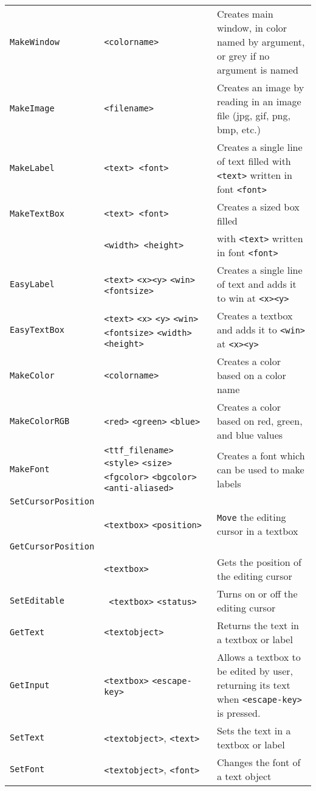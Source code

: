 \begin{longtable}{p{3cm}p{3cm}p{6cm}}
\verb+MakeWindow+ &\verb+<colorname>+ &Creates main window, in color named by argument, or grey if no argument is named\\ 
\verb+MakeImage+ &\verb+<filename>+ &Creates an image by reading in an image file (jpg, gif, png, bmp, etc.)\\ 
\verb+MakeLabel+ &\verb+<text> <font>+&Creates a single line of text filled with \verb+<text>+ written in font \verb+<font>+\\ 
\verb+MakeTextBox+ &\verb+<text> <font>+ &Creates a sized box filled \\ 
&\verb+<width> <height>+& with \verb+<text>+ written in font \verb+<font>+ \\ 
\verb+EasyLabel+ &\verb+<text>+ \verb+<x>+\verb+<y>+ \verb+<win>+\verb+<fontsize>+&Creates a single line of text and adds it to win at \verb+<x>+\verb+<y>+\\ 
\verb+EasyTextBox+ &\verb+<text>+ \verb+<x>+ \verb+<y>+ \verb+<win>+ \verb+<fontsize>+ \verb+<width>+ \verb+<height>+&Creates a textbox and adds it to \verb+<win>+ at \verb+<x>+\verb+<y>+\\ 
\verb+MakeColor+ &\verb+<colorname>+ & Creates a color based on a color name\\ 
\verb+MakeColorRGB+ &\verb+<red>+ \verb+<green>+ \verb+<blue>+ & Creates a color based on red, green, and blue values\\ 
\verb+MakeFont+ &\verb+<ttf_filename>+ \verb+<style>+ \verb+<size>+ \verb+<fgcolor>+ \verb+<bgcolor>+ \verb+<anti-aliased>+&Creates a font which can be used to make labels \\ 
\verb+SetCursorPosition+\\
   &\verb+<textbox>+ \verb+<position>+ & \verb+Move+ the editing cursor in a textbox\\ 
\verb+GetCursorPosition+\\
   &\verb+<textbox>+ &Gets the position of the editing cursor\\ 
\verb+SetEditable+ &\verb+ <textbox>+ \verb+<status>+& Turns on or off the editing cursor\\ 
\verb+GetText+ &\verb+<textobject>+ &Returns the text in a textbox or label\\ 
\verb+GetInput+ &\verb+<textbox>+ \verb+<escape-key>+& Allows a textbox to be edited by user, returning its text when \verb+<escape-key>+ is pressed.\\ 
\verb+SetText+ &\verb+<textobject>+, \verb+<text>+ &Sets the text in a textbox or label\\ 
\verb+SetFont+ &\verb+<textobject>+, \verb+<font>+ &Changes the font of a text object \\ 

\end{longtable}
